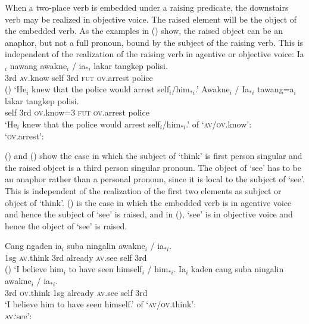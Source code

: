 \documentclass[output=paper,biblatex,babelshorthands,newtxmath,draftmode,colorlinks,citecolor=brown]{langscibook}
\begin{document}
When a two-place verb is embedded under a raising predicate, the downstairs verb may be realized in
objective voice. The raised element will be the object of the embedded verb. As the examples in
() show, the raised object can be an anaphor, but not a full pronoun, bound by the subject of
the raising verb. This is independent of the realization of the raising verb in agentive or objective voice: 
\eal
\ex 
\gll Ia$_i$ nawang           awakne$_i$ / ia$_{*i}$ lakar        tangkep            polisi.\\
    3rd    \textsc{av}.know self      {} 3rd      \textsc{fut} \textsc{ov}.arrest police\\\hfill()
\glt `He$_i$ knew that the police would arrest self$_{i}$/him$_{*i}$.'
\ex 
\gll Awakne$_i$ / Ia$_{*i}$        tawang=a$_i$           lakar       tangkep            polisi.\\
    self       {} \hphantom{*}3rd \textsc{ov}.know=3 \textsc{fut} \textsc{ov}.arrest police\\
\glt `He$_i$ knew that the police would arrest self$_{i}$/him$_{*i}$.'
\ex \argst of `\textsc{av}/\textsc{ov}.know':\\
\ex `\textsc{ov}.arrest':\\
\zl

\largerpage[2]
() and () show the case in which the \argst subject of `think' is first person singular and the
raised \argst object is a third person singular pronoun. The object of `see' has to be an anaphor rather than a personal pronoun,
since it is local to the subject of `see'. This is independent of the realization of the first two
\argst elements as subject or object of `think'. () is the case in which the embedded verb is
in agentive voice and hence the subject of `see' is raised, and in (), `see' is in objective voice and
hence the object of `see' is raised.

\eal
\ex
\gll Cang ngaden            ia$_i$ suba    ningalin        awakne$_i$ /  ia$_{*i}$.\\
     1sg  \textsc{av}.think 3rd    already \textsc{av}.see self       {} 3rd\\\hfill()
\glt `I believe him$_i$ to have seen himself$_i$ / him$_{*i}$.
\ex
\gll Ia$_i$ kaden             cang suba    ningalin        awakne$_i$ / ia$_{*i}$.\\ 
     3rd \textsc{ov}.think 1sg  already \textsc{av}.see self       {} 3rd\\
\glt `I believe him to have seen himself.'
\ex \argst of `\textsc{av}/\textsc{ov}.think':\\
\ex \textsc{av}.`see':\\
\zl
\end{document}

